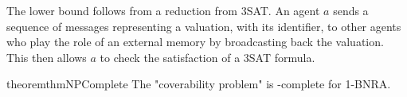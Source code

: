 %
%
%

The \NP lower bound follows from a reduction from 3SAT. An agent $a$ sends a sequence of messages representing a valuation, with its identifier, to other agents who play the role of an external memory by broadcasting back the valuation. This then allows $a$ to check the satisfaction of a 3SAT formula. 
%


\begin{restatable}{theorem}{thmNPComplete}
	\label{thm:np-complete-query-cover}
	The "coverability problem" is \NP-complete for 1-BNRA.
\end{restatable}

